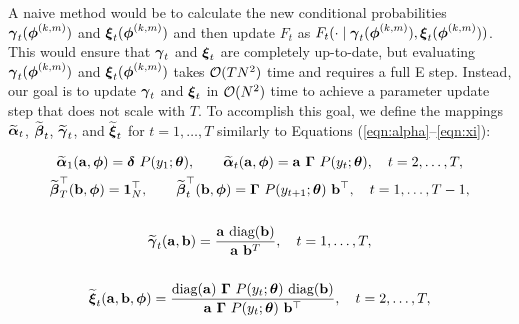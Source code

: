 A naive method would be to calculate the new conditional probabilities $\boldsymbol{\gamma}_{t}(\boldsymbol{\phi}^{(k,m)})$ and $\boldsymbol{\xi}_{t}(\boldsymbol{\phi}^{(k,m)})$ and then update $F_{t}$ as $F_{t}(\cdot \mid \boldsymbol{\gamma}_{t}(\boldsymbol{\phi}^{(k,m)}), \boldsymbol{\xi}_{t}(\boldsymbol{\phi}^{(k,m)}))$. This would ensure that $\boldsymbol{\gamma}_{t}$ and $\boldsymbol{\xi}_{t}$ are completely up-to-date, but evaluating $\boldsymbol{\gamma}_{t}(\boldsymbol{\phi}^{(k,m)})$ and $\boldsymbol{\xi}_{t}(\boldsymbol{\phi}^{(k,m)})$ takes $\mathcal{O}(TN^2)$ time and requires a full E step. Instead, our goal is to update $\boldsymbol{\gamma}_{t}$ and $\boldsymbol{\xi}_{t}$ in $\mathcal{O}(N^2)$ time to achieve a parameter update step that does not scale with $T$.
%
To accomplish this goal, we define the mappings $\widetilde {\boldsymbol{\alpha}}_t$, $\widetilde {\boldsymbol{\beta}}_t$, $\widetilde {\boldsymbol{\gamma}}_t$, and $\widetilde {\boldsymbol{\xi}}_t$ for $t = 1,\ldots,T$ similarly to Equations (\ref{eqn:alpha}--\ref{eqn:xi}):

\begin{gather}
    \widetilde {\boldsymbol{\alpha}}_1(\mathbf{a},\boldsymbol{\phi}) = \boldsymbol{\delta} ~ P(y_1;\boldsymbol{\theta}), \qquad \widetilde {\boldsymbol{\alpha}}_t(\mathbf{a},\boldsymbol{\phi}) = \mathbf{a} ~ \boldsymbol{\Gamma} ~ P(y_t;\boldsymbol{\theta}), \quad t = 2,\ldots,T, \label{eqn:tilde_alpha} \\
    \widetilde {\boldsymbol{\beta}}^\top_T(\mathbf{b},\boldsymbol{\phi}) = \mathbf{1}_N^\top, \qquad \widetilde {\boldsymbol{\beta}}^\top_t(\mathbf{b},\boldsymbol{\phi}) = \boldsymbol{\Gamma} ~ P(y_{t+1};\boldsymbol{\theta}) ~ \mathbf{b}^\top, \quad t = 1,\ldots,T-1, \label{eqn:tilde_beta} \\ \nonumber \\
    \widetilde {\boldsymbol{\gamma}}_t(\mathbf{a},\mathbf{b}) = \frac{\mathbf{a} ~ \text{diag}(\mathbf{b})}{\mathbf{a} ~ \mathbf{b}^T}, \quad t = 1,\ldots,T, \label{eqn:tilde_gamma} \\ \nonumber \\
    \widetilde {\boldsymbol{\xi}}_{t}(\mathbf{a},\mathbf{b},\boldsymbol{\phi}) = \frac{\text{diag}(\mathbf{a}) ~ \boldsymbol{\Gamma} ~ P(y_t;\boldsymbol{\theta}) ~ \text{diag}(\mathbf{b})}{\mathbf{a} ~ \boldsymbol{\Gamma} ~ P(y_{t};\boldsymbol{\theta}) ~ \mathbf{b}^\top}, \quad t = 2,\ldots,T \label{eqn:tilde_xi},
\end{gather}
%

